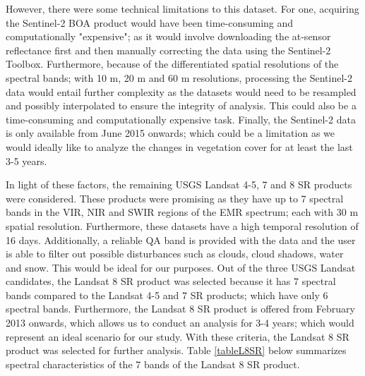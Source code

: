 \justify
However, there were some technical limitations to this dataset. For one, acquiring the Sentinel-2 BOA product would have been time-consuming and computationally "expensive"; as it would involve downloading the at-sensor reflectance first and then manually correcting the data using the Sentinel-2 Toolbox. Furthermore, because of the differentiated spatial resolutions of the spectral bands; with 10 m, 20 m and 60 m resolutions, processing the Sentinel-2 data would entail further complexity as the datasets would need to be resampled and possibly interpolated to ensure the integrity of analysis. This could also be a time-consuming and computationally expensive task. Finally, the Sentinel-2 data is only available from June 2015 onwards; which could be a limitation as we would ideally like to analyze the changes in vegetation cover for at least the last 3-5 years.

\justify
In light of these factors, the remaining USGS Landsat 4-5, 7 and 8 SR products were considered. These products were promising as they have up to 7 spectral bands in the VIR, NIR and SWIR regions of the EMR spectrum; each with 30 m spatial resolution. Furthermore, these datasets have a high temporal resolution of 16 days. Additionally, a reliable QA band is provided with the data and the user is able to filter out possible disturbances such as clouds, cloud shadows, water and snow. This would be ideal for our purposes. Out of the three USGS Landsat candidates, the Landsat 8 SR product was selected because it has 7 spectral bands compared to the Landsat 4-5 and 7 SR products; which have only 6 spectral bands. Furthermore, the Landsat 8 SR product is offered from February 2013 onwards, which allows us to conduct an analysis for 3-4 years; which would represent an ideal scenario for our study. With these criteria, the Landsat 8 SR product was selected for further analysis. Table \ref{tableL8SR} below summarizes spectral characteristics of the 7 bands of the Landsat 8 SR product.

